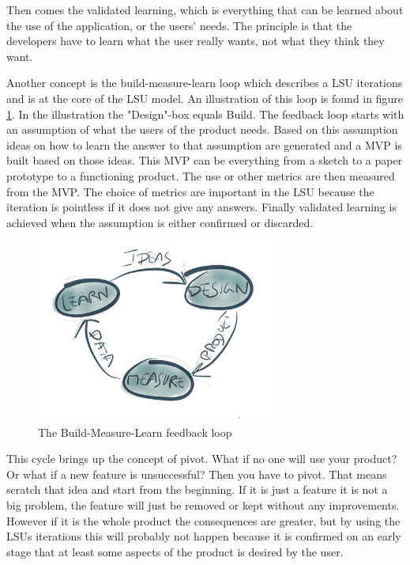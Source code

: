 Then comes the validated learning, which is everything that can be learned about the use of the application, or the users' needs. The principle is that the developers have to learn what the user really wants, not what they think they want.

Another concept is the build-measure-learn loop which describes a \gls{LSU} iterations and is at the core of the \gls{LSU} model. An illustration of this loop is found in figure \ref{fig:build-measure-learn}. In the illustration the "Design"-box equals Build. 
The feedback loop starts with an assumption of what the users of the product needs. Based on this assumption ideas on how to learn the answer to that assumption are generated and a \gls{MVP} is built based on those ideas. This \gls{MVP} can be everything from a sketch to a paper prototype to a functioning product. The use or other metrics are then measured from the \gls{MVP}. The choice of metrics are important in the \gls{LSU} because the iteration is pointless if it does not give any answers. Finally validated learning is achieved when the assumption is either confirmed or discarded.
\begin{figure}
\centering
\includegraphics[height=6cm]{figs/build-measure-learn.png}
\caption{The Build-Measure-Learn feedback loop}
\label{fig:build-measure-learn}
\end{figure}

This cycle brings up the concept of pivot. What if no one will use your product? Or what if a new feature is unsuccessful? Then you have to pivot. That means scratch that idea and start from the beginning. If it is just a feature it is not a big problem, the feature will just be removed or kept without any improvements. However if it is the whole product the consequences are greater, but by using the \gls{LSU}s iterations this will probably not happen because it is confirmed on an early stage that at least some aspects of the product is desired by the user.  

